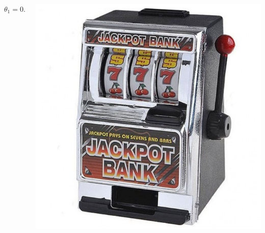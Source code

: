 \documentclass[fullscreen=true, bookmarks=true, hyperref={pdfencoding=unicode}]{beamer}
\begin{document}
\begin{frame}
\begin{columns}
\begin{column}{.25\paperwidth}
\begin{center}
        $\theta_1 = 0.02$
        \end{center}
      \end{column}
      \begin{column}{.25\paperwidth}
        \begin{center}
          \includegraphics[keepaspectratio,
                           width=.2\paperwidth]{data-kopilkabandit.jpg}


\end{center}
\end{column}
\end{columns}
\end{frame}
\end{document}
